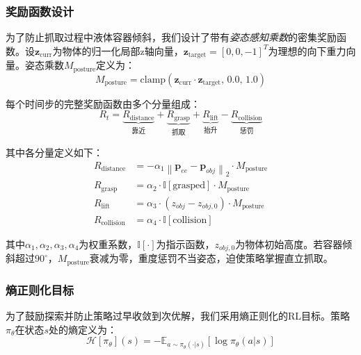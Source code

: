 \subsubsection{奖励函数设计}
\label{subsec:reward_design}

为了防止抓取过程中液体容器倾斜，我们设计了带有\textit{姿态感知乘数}的密集奖励函数。设$\mathbf{z}_{\text{curr}}$为物体的归一化局部z轴向量，$\mathbf{z}_{\text{target}} = [0, 0, -1]^T$为理想的向下重力向量。姿态乘数$M_{\text{posture}}$定义为：
\begin{equation}
    M_{\text{posture}} = \text{clamp}(\mathbf{z}_{\text{curr}} \cdot \mathbf{z}_{\text{target}}, \, 0.0, \, 1.0)
\end{equation}

每个时间步的完整奖励函数由多个分量组成：
\begin{equation}
    R_t = \underbrace{R_{\text{distance}}}_{\text{靠近}} + \underbrace{R_{\text{grasp}}}_{\text{抓取}} + \underbrace{R_{\text{lift}}}_{\text{抬升}} - \underbrace{R_{\text{collision}}}_{\text{惩罚}}
\end{equation}

其中各分量定义如下：
\begin{align}
    R_{\text{distance}} &= -\alpha_1 \left\| \mathbf{p}_{ee} - \mathbf{p}_{obj} \right\|_2 \cdot M_{\text{posture}} \\
    R_{\text{grasp}} &= \alpha_2 \cdot \mathbb{I}[\text{grasped}] \cdot M_{\text{posture}} \\
    R_{\text{lift}} &= \alpha_3 \cdot (z_{obj} - z_{obj,0}) \cdot M_{\text{posture}} \\
    R_{\text{collision}} &= \alpha_4 \cdot \mathbb{I}[\text{collision}]
\end{align}

其中$\alpha_1, \alpha_2, \alpha_3, \alpha_4$为权重系数，$\mathbb{I}[\cdot]$为指示函数，$z_{obj,0}$为物体初始高度。若容器倾斜超过$90^\circ$，$M_{\text{posture}}$衰减为零，重度惩罚不当姿态，迫使策略掌握直立抓取。

\subsubsection{熵正则化目标}
\label{subsec:entropy}

为了鼓励探索并防止策略过早收敛到次优解，我们采用熵正则化的RL目标。策略$\pi_\theta$在状态$s$处的熵定义为：
\begin{equation}
    \mathcal{H}[\pi_\theta](s) = -\mathbb{E}_{a \sim \pi_\theta(\cdot|s)} \left[ \log \pi_\theta(a | s) \right]
\end{equation}

